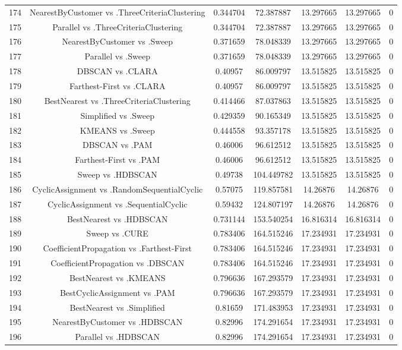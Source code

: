 \documentclass[a4paper,10pt]{article}
\begin{document}
\begin{landscape}
\begin{table}[!htp]
\begin{tabular}{ccccccc}
174&NearestByCustomer vs .ThreeCriteriaClustering&0.344704&72.387887&13.297665&13.297665&0\\
175&Parallel vs .ThreeCriteriaClustering&0.344704&72.387887&13.297665&13.297665&0\\
176&NearestByCustomer vs .Sweep&0.371659&78.048339&13.297665&13.297665&0\\
177&Parallel vs .Sweep&0.371659&78.048339&13.297665&13.297665&0\\
178&DBSCAN vs .CLARA&0.40957&86.009797&13.515825&13.515825&0\\
179&Farthest-First vs .CLARA&0.40957&86.009797&13.515825&13.515825&0\\
180&BestNearest vs .ThreeCriteriaClustering&0.414466&87.037863&13.515825&13.515825&0\\
181&Simplified vs .Sweep&0.429359&90.165349&13.515825&13.515825&0\\
182&KMEANS vs .Sweep&0.444558&93.357178&13.515825&13.515825&0\\
183&DBSCAN vs .PAM&0.46006&96.612512&13.515825&13.515825&0\\
184&Farthest-First vs .PAM&0.46006&96.612512&13.515825&13.515825&0\\
185&Sweep vs .HDBSCAN&0.49738&104.449782&13.515825&13.515825&0\\
186&CyclicAssignment vs .RandomSequentialCyclic&0.57075&119.857581&14.26876&14.26876&0\\
187&CyclicAssignment vs .SequentialCyclic&0.59432&124.807197&14.26876&14.26876&0\\
188&BestNearest vs .HDBSCAN&0.731144&153.540254&16.816314&16.816314&0\\
189&Sweep vs .CURE&0.783406&164.515246&17.234931&17.234931&0\\
190&CoefficientPropagation vs .Farthest-First&0.783406&164.515246&17.234931&17.234931&0\\
191&CoefficientPropagation vs .DBSCAN&0.783406&164.515246&17.234931&17.234931&0\\
192&BestNearest vs .KMEANS&0.796636&167.293579&17.234931&17.234931&0\\
193&BestCyclicAssignment vs .PAM&0.796636&167.293579&17.234931&17.234931&0\\
194&BestNearest vs .Simplified&0.81659&171.483953&17.234931&17.234931&0\\
195&NearestByCustomer vs .HDBSCAN&0.82996&174.291654&17.234931&17.234931&0\\
196&Parallel vs .HDBSCAN&0.82996&174.291654&17.234931&17.234931&0\\

\end{tabular}
\end{table}
\end{landscape}
\end{document}

